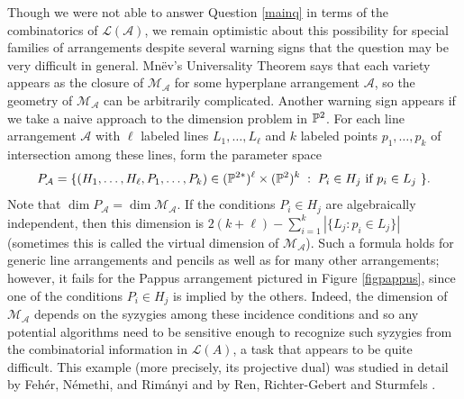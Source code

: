 \documentclass[12pt]{article}
\theoremstyle{plain}
\theoremstyle{definition}
\newcommand{\A}{\mathcal{A}}
\newcommand{\M}{\mathcal{M}}
\renewcommand{\L}{\mathcal{L}}
\renewcommand{\P}{\ensuremath \mathbb{P}}
\begin{document}
Though we were not able to answer Question \ref{mainq} in terms of the
combinatorics of $\L(\A)$, we remain optimistic about this possibility
for special families of arrangements despite several warning signs that the question may be very
difficult in general. Mn\"{e}v's Universality Theorem  says that each variety appears as the
closure of $\M_\A$ for some hyperplane arrangement $\A$, so the
geometry of $\M_\A$ can be arbitrarily complicated. Another warning
sign appears if we take a naive approach to the dimension problem in
$\P^2$.  For each line arrangement $\A$ with $\ell$ labeled lines
$L_1, \ldots, L_\ell$ and $k$ labeled points $p_1, \ldots, p_k$ of
intersection among these lines, form the parameter space
$$ P_\A = \{ (H_1, \ldots, H_\ell, P_1, \ldots, P_k) \in (\P^{2*})^\ell \times
(\P^2)^k \; : \; P_i \in H_j \text{ if $p_i \in L_j$ }\}. $$ Note that
$\dim P_{\A} = \dim \M_\A$. If the conditions $P_i \in H_j$ are
algebraically independent, then this dimension is $2(k+\ell) -
\sum_{i=1}^k |\{ L_j : p_i \in L_j\}|$ (sometimes this is called the
virtual dimension of $\M_\A$). Such a formula holds for
generic line arrangements and pencils as well as for many other
arrangements; however, it fails for the Pappus arrangement pictured in
Figure \ref{figpappus}, since one
of the conditions $P_i \in H_j$ is implied by the others. Indeed, the
dimension of $\M_\A$ depends on the syzygies among these incidence
conditions and so any potential algorithms need to be sensitive enough
to recognize such syzygies from the combinatorial information in
$\L(A)$, a task that appears to be quite difficult. This example (more
precisely, its projective dual) was studied in detail by Feh{\'e}r,
N{\'e}methi, and Rim{\'a}nyi \cite{Rimanyi} and by Ren, Richter-Gebert and Sturmfels \cite{Ren}. 
\end{document}
